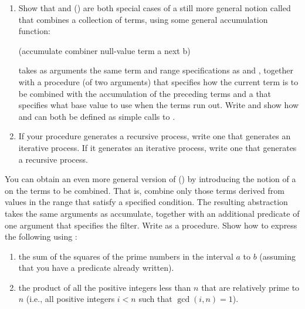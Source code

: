 \begin{exercise}
	\label{Exercise 1.32}
	\begin{enumerate}[label = \alph*., leftmargin = *]

		\item
			Show that  and  () are both special cases of a still more general notion called  that combines a collection of terms, using some general accumulation function:
			\begin{scheme}
			  (accumulate combiner null-value term a next b)
			\end{scheme}

			 takes as arguments the same term and range specifications as  and , together with a  procedure (of two arguments) that specifies how the current term is to be combined with the accumulation of the preceding terms and a  that specifies what base value to use when the terms run out.
			Write  and show how  and  can both be defined as simple calls to .

		\item
			If your  procedure generates a recursive process, write one that generates an iterative process.
			If it generates an iterative process, write one that generates a recursive process.

	\end{enumerate}
\end{exercise}



\begin{exercise}
	\label{Exercise 1.33}
	You can obtain an even more general version of  () by introducing the notion of a  on the terms to be combined.
	That is, combine only those terms derived from values in the range that satisfy a specified condition.
	The resulting  abstraction takes the same arguments as accumulate, together with an additional predicate of one argument that specifies the filter.
	Write  as a procedure.
	Show how to express the following using :
	\begin{enumerate}[label = \alph*., leftmargin = *]

		\item
			the sum of the squares of the prime numbers in the interval \( a \) to \( b \) (assuming that you have a  predicate already written).

		\item
			the product of all the positive integers less than \( n \) that are relatively prime to \( n \) (i.e., all positive integers \( i < n \) such that \( \gcd(i, n) = 1 \)).

	\end{enumerate}
\end{exercise}



